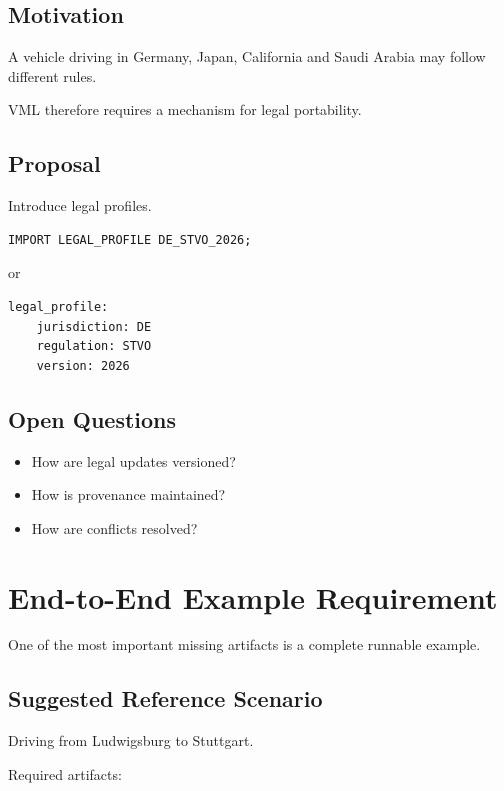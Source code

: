 \documentclass[a4paper,11pt]{article}
\begin{document}
\subsection{Motivation}

A vehicle driving in Germany,
Japan,
California
and Saudi Arabia may follow different rules.

VML therefore requires a mechanism for legal portability.

\subsection{Proposal}

Introduce legal profiles.

\begin{verbatim}
IMPORT LEGAL_PROFILE DE_STVO_2026;
\end{verbatim}

or

\begin{verbatim}
legal_profile:
    jurisdiction: DE
    regulation: STVO
    version: 2026
\end{verbatim}

\subsection{Open Questions}

\begin{itemize}
\item How are legal updates versioned?
\item How is provenance maintained?
\item How are conflicts resolved?
\end{itemize}

\section{End-to-End Example Requirement}

One of the most important missing artifacts is a complete runnable example.

\subsection{Suggested Reference Scenario}

Driving from Ludwigsburg to Stuttgart.

Required artifacts:
\end{document}
